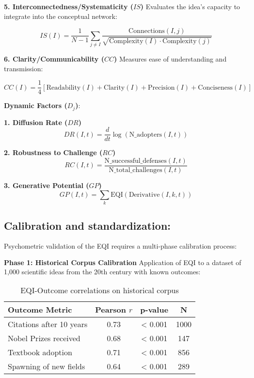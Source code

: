 \textbf{5. Interconnectedness/Systematicity ($IS$)}
Evaluates the idea's capacity to integrate into the conceptual network:

\begin{equation}
	IS(I) = \frac{1}{N-1} \sum_{j \neq I} \frac{\text{Connections}(I,j)}{\sqrt{\text{Complexity}(I) \cdot \text{Complexity}(j)}}
	\label{eq:interconnectedness}
\end{equation}

\textbf{6. Clarity/Communicability ($CC$)}
Measures ease of understanding and transmission:

\begin{equation}
	CC(I) = \frac{1}{4}[\text{Readability}(I) + \text{Clarity}(I) + \text{Precision}(I) + \text{Conciseness}(I)]
	\label{eq:communicability}
\end{equation}

\textbf{Dynamic Factors ($D_j$)}:

\textbf{1. Diffusion Rate ($DR$)}
\begin{equation}
	DR(I,t) = \frac{d}{dt}\log(\text{N\_adopters}(I,t))
	\label{eq:diffusion-rate}
\end{equation}

\textbf{2. Robustness to Challenge ($RC$)}
\begin{equation}
	RC(I,t) = \frac{\text{N\_successful\_defenses}(I,t)}{\text{N\_total\_challenges}(I,t)}
	\label{eq:robustness}
\end{equation}

\textbf{3. Generative Potential ($GP$)}
\begin{equation}
	GP(I,t) = \sum_{k} \text{EQI}(\text{Derivative}(I,k,t))
	\label{eq:generative-potential}
\end{equation}

\subsection{Calibration and standardization:}

Psychometric validation of the EQI requires a multi-phase calibration process:

\textbf{Phase 1: Historical Corpus Calibration}
Application of EQI to a dataset of 1,000 scientific ideas from the 20th century with known outcomes:

\begin{table}[h]
	\centering
	\caption{EQI-Outcome correlations on historical corpus}
	\label{tab:eqi-validation}
	\begin{tabular}{lccc}
		\toprule
		\textbf{Outcome Metric} & \textbf{Pearson $r$} & \textbf{p-value} & \textbf{N} \\
		\midrule
		Citations after 10 years & 0.73 & < 0.001 & 1000 \\
		Nobel Prizes received & 0.68 & < 0.001 & 147 \\
		Textbook adoption & 0.71 & < 0.001 & 856 \\
		Spawning of new fields & 0.64 & < 0.001 & 289 \\
		\bottomrule
	\end{tabular}
\end{table}

